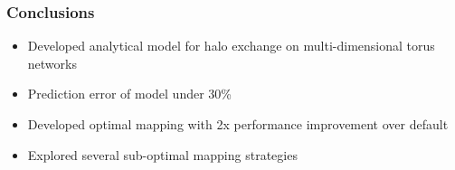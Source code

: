 \documentclass{beamer}
\begin{document}
\begin{frame}
\frametitle{Conclusions}
\begin{itemize}
  \item Developed analytical model for halo exchange on multi-dimensional torus networks
  \item Prediction error of model under 30\%
  \item Developed optimal mapping with 2x performance improvement over default
  \item Explored several sub-optimal mapping strategies
\end{itemize}
\end{frame}
\end{document}
